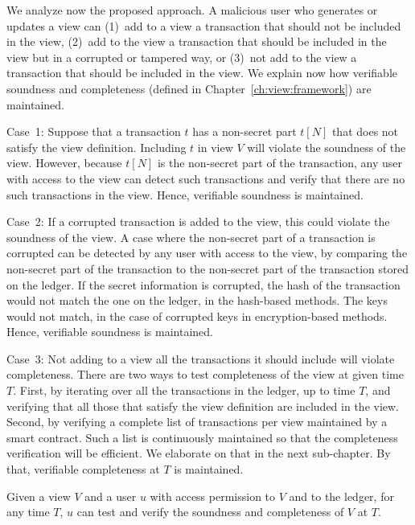 We analyze now the proposed approach.
A malicious user who generates or updates a view can
(1)~add to a view a transaction that should not be included in the view, (2)~add to the view a transaction that should be included in the view but in a corrupted or tampered way, or
(3)~not add to the view a transaction that should be included in the view. We explain now how verifiable soundness and completeness (defined in Chapter~\ref{ch:view:framework}) are maintained.

Case~1: Suppose that a transaction $t$ has a non-secret part $t[N]$ that does not satisfy the view definition. Including $t$ in view $V$ will violate the soundness of the view. However, because $t[N]$ is the non-secret part of the transaction, any user with access to the view can detect such transactions and verify that there are no such transactions in the view. Hence, verifiable soundness is maintained.

Case~2: If a corrupted transaction is added to the view, this could violate the soundness of the view. A case where the non-secret part of a transaction is corrupted can be detected by any user with access to the view, by comparing the non-secret part of the transaction to the non-secret part of the transaction stored on the ledger. If the secret information is corrupted, the hash of the transaction would not match the one on the ledger, in the hash-based methods. The keys would not match, in the case of corrupted keys in encryption-based methods. Hence, verifiable soundness is maintained.

Case~3: Not adding to a view all the transactions it should include will violate completeness. There are two ways to test completeness of the view at  given time $T$. First, by iterating over all the transactions in the ledger, up to time $T$, and verifying that all those that satisfy the view definition are included in the view. Second, by verifying a complete list of transactions per view maintained by a smart contract. Such a list is continuously maintained so that the completeness verification will be efficient. We elaborate on that in the next sub-chapter. By that, verifiable completeness at $T$ is maintained.   

\begin{proposition}
Given a view $V$ and a user $u$ with access permission to $V$ and to the ledger, for any time $T$, $u$ can test and verify the soundness and completeness of $V$ at $T$.
\end{proposition}

